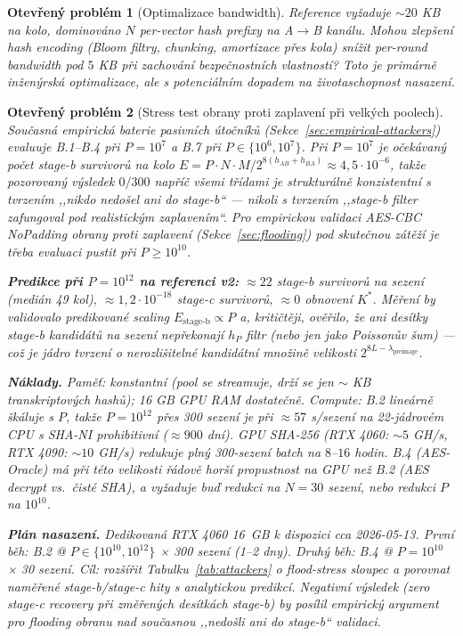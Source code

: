 \documentclass[11pt,a4paper]{article}
\newtheorem{openproblem}{Otev\v{r}en\'y probl\'em}
\begin{document}
\begin{openproblem}[Optimalizace bandwidth]\label{prob:bandwidth}
Reference vyžaduje $\sim 20$ KB na kolo, dominováno $N$ per-vector hash prefixy na A$\to$B kanálu. Mohou zlepšení hash encoding (Bloom filtry, chunking, amortizace přes kola) snížit per-round bandwidth pod $5$ KB při zachování bezpečnostních vlastností? Toto je primárně inženýrská optimalizace, ale s potenciálním dopadem na životaschopnost nasazení.
\end{openproblem}

\begin{openproblem}[Stress test obrany proti zaplavení při velkých poolech]\label{prob:flood-stress}
Současná empirická baterie pasivních útočníků (Sekce~\ref{sec:empirical-attackers}) evaluuje B.1--B.4 při $P = 10^7$ a B.7 při $P \in \{10^6, 10^7\}$. Při $P = 10^7$ je očekávaný počet stage-b survivorů na kolo $E = P \cdot N \cdot M / 2^{8(h_{AB} + h_{BA})} \approx 4{,}5 \cdot 10^{-6}$, takže pozorovaný výsledek $0/300$ napříč všemi třídami je strukturálně konzistentní s tvrzením ,,nikdo nedošel ani do stage-b`` --- nikoli s tvrzením ,,stage-b filter zafungoval pod realistickým zaplavením``. Pro empirickou validaci AES-CBC NoPadding obrany proti zaplavení (Sekce~\ref{sec:flooding}) pod skutečnou zátěží je třeba evaluaci pustit při $P \geq 10^{10}$.

\textbf{Predikce při $P = 10^{12}$ na referenci v2:} $\approx 22$ stage-b survivorů na sezení (medián 49 kol), $\approx 1{,}2 \cdot 10^{-18}$ stage-c survivorů, $\approx 0$ obnovení $K^*$. Měření by validovalo predikované scaling $E_{\text{stage-b}} \propto P$ a, kritičtěji, ověřilo, že ani desítky stage-b kandidátů na sezení nepřekonají $h_P$ filtr (nebo jen jako Poissonův šum) --- což je jádro tvrzení o nerozlišitelné kandidátní množině velikosti $2^{8L - \lambda_{\text{preimage}}}$.

\textbf{Náklady.} Paměť: konstantní (pool se streamuje, drží se jen $\sim$ KB transkriptových hashů); 16 GB GPU RAM dostatečně. Compute: B.2 lineárně škáluje s $P$, takže $P = 10^{12}$ přes 300 sezení je při $\approx 57$ s/sezení na 22-jádrovém CPU s SHA-NI prohibitivní ($\approx 900$ dní). GPU SHA-256 (RTX 4060: $\sim 5$ GH/s, RTX 4090: $\sim 10$ GH/s) redukuje plný 300-sezení batch na $8$--$16$ hodin. B.4 (AES-Oracle) má při této velikosti řádově horší propustnost na GPU než B.2 (AES decrypt vs.\ čisté SHA), a vyžaduje buď redukci na $N = 30$ sezení, nebo redukci $P$ na $10^{10}$.

\textbf{Plán nasazení.} Dedikovaná RTX 4060 16~GB k dispozici cca 2026-05-13. První běh: B.2 @ $P \in \{10^{10}, 10^{12}\}$ × 300 sezení (1--2 dny). Druhý běh: B.4 @ $P = 10^{10}$ × 30 sezení. Cíl: rozšířit Tabulku~\ref{tab:attackers} o flood-stress sloupec a porovnat naměřené stage-b/stage-c hity s analytickou predikcí. Negativní výsledek (zero stage-c recovery při změřených desítkách stage-b) by posílil empirický argument pro flooding obranu nad současnou ,,nedošli ani do stage-b`` validaci.
\end{openproblem}
\end{document}

